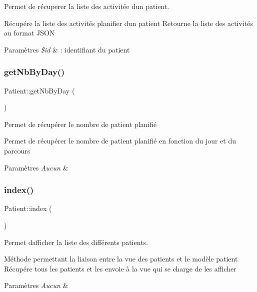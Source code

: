 Permet de récuperer la liste des activitée d\textquotesingle{}un patient. 

Récupére la liste des activités planifier d\textquotesingle{}un patient Retourne la liste des activités au format J\+S\+ON 
\begin{DoxyParams}{Paramètres}
{\em \$id} & \+: identifiant du patient \\
\hline
\end{DoxyParams}
\mbox{\label{class_patient_a4c2082a23e84c8aa192640a1afd8e859}} 
\subsubsection{\texorpdfstring{get\+Nb\+By\+Day()}{getNbByDay()}}
{\footnotesize\ttfamily Patient\+::get\+Nb\+By\+Day (\begin{DoxyParamCaption}{ }\end{DoxyParamCaption})}



Permet de récupérer le nombre de patient planifié 

Permet de récupérer le nombre de patient planifié en fonction du jour et du parcours 
\begin{DoxyParams}{Paramètres}
{\em Aucun} & \\
\hline
\end{DoxyParams}
\mbox{\label{class_patient_a292b1a3be44804e50a412edc3c282cec}} 
\subsubsection{\texorpdfstring{index()}{index()}}
{\footnotesize\ttfamily Patient\+::index (\begin{DoxyParamCaption}{ }\end{DoxyParamCaption})}



Permet d\textquotesingle{}afficher la liste des différents patients. 

Méthode permettant la liaison entre la vue des patients et le modèle patient Récupére tous les patients et les envoie à la vue qui se charge de les afficher 
\begin{DoxyParams}{Paramètres}
{\em Aucun} & \\
\hline
\end{DoxyParams}
\mbox{\label{class_patient_a013e328ee230d66adc47dddbf997e3ec}} 
